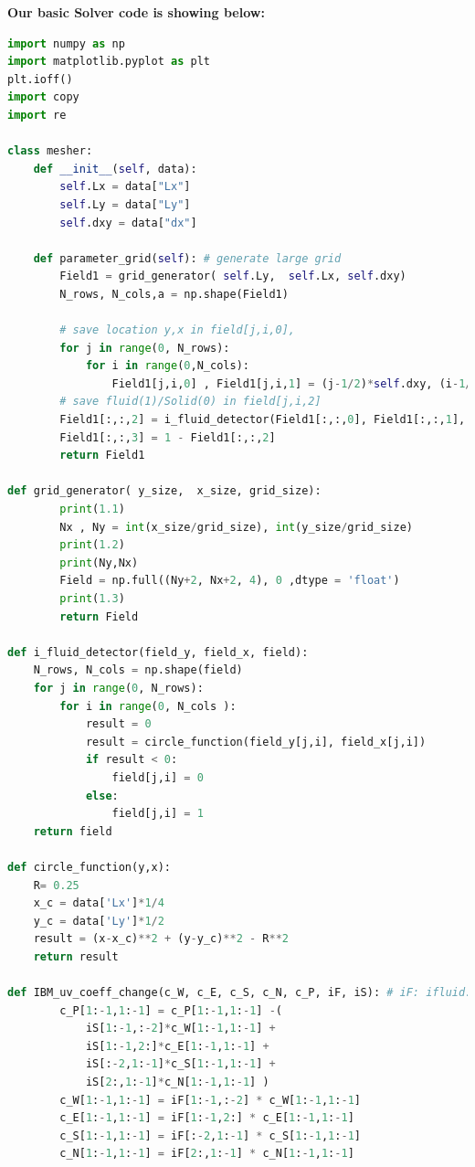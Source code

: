 \documentclass[12pt]{article}
\begin{document}
\noindent \textbf{Our basic Solver code is showing below:}
\begin{scriptsize}
\begin{lstlisting}[language=python,caption={N-S Cylinder Solver}]
import numpy as np
import matplotlib.pyplot as plt
plt.ioff() 
import copy
import re

class mesher:
    def __init__(self, data):
        self.Lx = data["Lx"]
        self.Ly = data["Ly"]
        self.dxy = data["dx"]

    def parameter_grid(self): # generate large grid 
        Field1 = grid_generator( self.Ly,  self.Lx, self.dxy)
        N_rows, N_cols,a = np.shape(Field1)

        # save location y,x in field[j,i,0], 
        for j in range(0, N_rows):
            for i in range(0,N_cols):
                Field1[j,i,0] , Field1[j,i,1] = (j-1/2)*self.dxy, (i-1/2)*self.dxy
        # save fluid(1)/Solid(0) in field[j,i,2]
        Field1[:,:,2] = i_fluid_detector(Field1[:,:,0], Field1[:,:,1], Field1[:,:,2])
        Field1[:,:,3] = 1 - Field1[:,:,2]
        return Field1
    
def grid_generator( y_size,  x_size, grid_size):
        print(1.1)
        Nx , Ny = int(x_size/grid_size), int(y_size/grid_size)
        print(1.2)
        print(Ny,Nx)
        Field = np.full((Ny+2, Nx+2, 4), 0 ,dtype = 'float')
        print(1.3)
        return Field

def i_fluid_detector(field_y, field_x, field):
    N_rows, N_cols = np.shape(field)
    for j in range(0, N_rows):
        for i in range(0, N_cols ):
            result = 0
            result = circle_function(field_y[j,i], field_x[j,i])
            if result < 0:
                field[j,i] = 0
            else:
                field[j,i] = 1
    return field

def circle_function(y,x):
    R= 0.25
    x_c = data['Lx']*1/4
    y_c = data['Ly']*1/2
    result = (x-x_c)**2 + (y-y_c)**2 - R**2
    return result
        
def IBM_uv_coeff_change(c_W, c_E, c_S, c_N, c_P, iF, iS): # iF: ifluid. iS: isolid
        c_P[1:-1,1:-1] = c_P[1:-1,1:-1] -(
            iS[1:-1,:-2]*c_W[1:-1,1:-1] +
            iS[1:-1,2:]*c_E[1:-1,1:-1] +
            iS[:-2,1:-1]*c_S[1:-1,1:-1] +
            iS[2:,1:-1]*c_N[1:-1,1:-1] ) 
        c_W[1:-1,1:-1] = iF[1:-1,:-2] * c_W[1:-1,1:-1]
        c_E[1:-1,1:-1] = iF[1:-1,2:] * c_E[1:-1,1:-1]
        c_S[1:-1,1:-1] = iF[:-2,1:-1] * c_S[1:-1,1:-1]
        c_N[1:-1,1:-1] = iF[2:,1:-1] * c_N[1:-1,1:-1]


\end{lstlisting}
\end{scriptsize}
\end{document}
